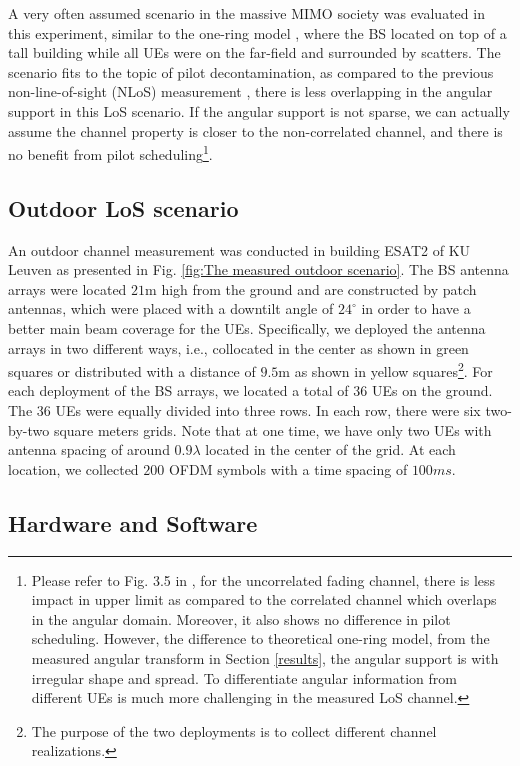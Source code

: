 A very often assumed scenario in the massive MIMO society was evaluated in this experiment, similar to the one-ring model \cite{bjornson2017massive}, where the BS located on top of a tall building while all UEs were on the far-field and surrounded by scatters. The scenario fits to the topic of pilot decontamination, as compared to the previous  non-line-of-sight (NLoS) measurement \cite{Chen2018pilot}, there is less overlapping in the angular support in this LoS scenario. If the angular support is not sparse, we can actually assume the channel property is closer to the non-correlated channel, and there is no benefit from pilot scheduling\footnote{Please refer to Fig. 3.5 in \cite{bjornson2017massive}, for the uncorrelated fading channel,  there is less impact in upper limit as compared to the correlated channel which overlaps in the angular domain. Moreover, it also shows no difference in pilot scheduling. However, the difference to theoretical one-ring model, from the measured angular transform in Section \ref{results}, the angular support is with irregular shape and spread. To differentiate angular information from different UEs is much more challenging in the measured LoS channel.}.   
\subsection{Outdoor LoS scenario}
An outdoor channel measurement was conducted in building ESAT2 of KU Leuven as presented in Fig. \ref{fig:The measured outdoor scenario}. The BS antenna arrays were located $21$m high from the ground and are constructed by patch antennas\cite{chen2017finite}, which were placed with a downtilt angle of $24^\circ$ in order to have a better main beam coverage for the UEs. Specifically, we deployed the antenna arrays in two different ways, i.e., collocated in the center as shown in green squares or distributed with a distance of $9.5$m as shown in yellow squares\footnote{The purpose of the two deployments is to collect different channel realizations.}. For each deployment of the BS arrays, we located a total of $36$ UEs on the ground. The $36$ UEs were equally divided into three rows. In each row, there were six two-by-two square meters grids. Note that at one time, we have only two UEs with antenna spacing of around $0.9\lambda$ located in the center of the grid. At each location, we collected $200$ OFDM symbols with a time spacing of $100ms$.
\subsection{Hardware and Software}

